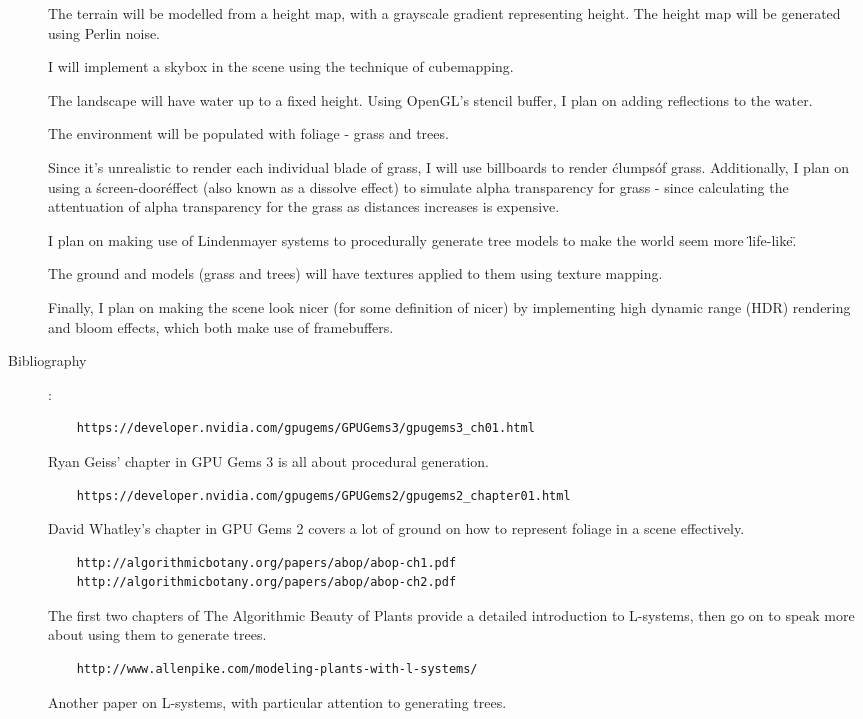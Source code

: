 \documentclass {article}
\begin{document}
\begin{description}
    The terrain will be modelled from a height map, with a grayscale gradient representing height. The height map will be generated using Perlin noise.

    I will implement a skybox in the scene using the technique of cubemapping.

    The landscape will have water up to a fixed height. Using OpenGL's stencil buffer, I plan on adding reflections to the water.

    The environment will be populated with foliage - grass and trees. 

    Since it's unrealistic to render each individual blade of grass, I will use billboards to render \'clumps\' of grass. Additionally, I plan on using a \'screen-door\' effect (also known as a dissolve effect) to simulate alpha transparency for grass - since calculating the attentuation of alpha transparency for the grass as distances increases is expensive.

    I plan on making use of Lindenmayer systems to procedurally generate tree models to make the world seem more \"life-like\".

    The ground and models (grass and trees) will have textures applied to them using texture mapping. 

    Finally, I plan on making the scene look nicer (for some definition of nicer) by implementing high dynamic range (HDR) rendering and bloom effects, which both make use of framebuffers.

\item[Bibliography]:\\

    \begin{verbatim}
    https://developer.nvidia.com/gpugems/GPUGems3/gpugems3_ch01.html
    \end{verbatim}
    Ryan Geiss' chapter in GPU Gems 3 is all about procedural generation.

    \begin{verbatim}
    https://developer.nvidia.com/gpugems/GPUGems2/gpugems2_chapter01.html
    \end{verbatim}
    David Whatley's chapter in GPU Gems 2 covers a lot of ground on how to represent foliage in a scene effectively.

    \begin{verbatim}
    http://algorithmicbotany.org/papers/abop/abop-ch1.pdf
    http://algorithmicbotany.org/papers/abop/abop-ch2.pdf
    \end{verbatim}
    The first two chapters of The Algorithmic Beauty of Plants provide a detailed introduction to L-systems, then go on to speak more about using them to generate trees.

    \begin{verbatim}
    http://www.allenpike.com/modeling-plants-with-l-systems/
    \end{verbatim}
    Another paper on L-systems, with particular attention to generating trees.

\end{description}
\newpage
\end{document}
